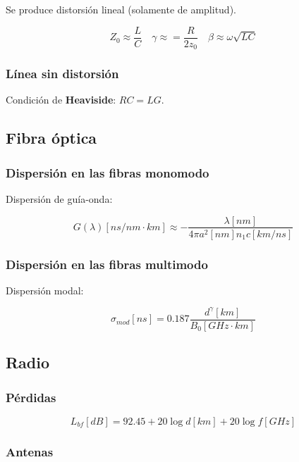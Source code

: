 \documentclass[12pt,a4paper]{article}
\begin{document}
Se produce distorsión lineal (solamente de amplitud).

\[ Z_0 \approx \frac{L}{C} \quad \gamma \approx = \frac{R}{2 z_0} \quad
\beta \approx \omega \sqrt{LC} \]

\subsubsection{Línea sin distorsión}
\label{ssub:linea_sin_distorsion}

Condición de \textbf{Heaviside}: $ RC = LG $.

\subsection{Fibra óptica}
\label{sub:fibra_optica}

\subsubsection{Dispersión en las fibras monomodo}
\label{ssub:dispersion_en_las_fibras_monomodo}

Dispersión de guía-onda:

\[ G(\lambda)[ns/nm \cdot km] \approx - \frac{\lambda [nm]}{4 \pi a^2 [nm] n_1
c[km/ns]} \]

\subsubsection{Dispersión en las fibras multimodo}
\label{ssub:dispersion_en_las_fibras_multimodo}

Dispersión modal:

\[ \sigma_{mod} [ns] = 0.187 \frac{d^{\gamma}[km]}{B_0 [GHz \cdot km]} \]

\subsection{Radio}
\label{sub:radio}

\subsubsection{Pérdidas}
\label{ssub:perdidas}

\[ L_{bf} [dB] = 92.45 + 20 \log{d[km]} + 20 \log{f [GHz]} \]

\subsubsection{Antenas}
\label{ssub:antenas}
\end{document}
